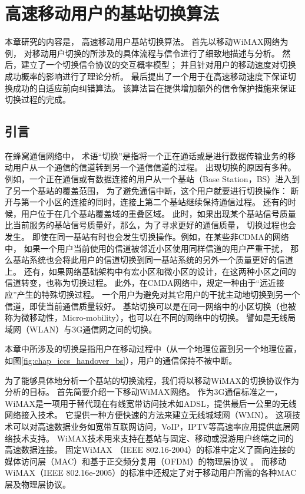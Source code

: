 \graphicspath{ {../body/handover_figures/}}
\chapter{高速移动用户的基站切换算法}
\label{chap_iccs_handover_alogrithm}
本章研究的内容是，
高速移动用户基站切换算法。
首先以移动WiMAX网络为例，
对移动用户切换的所涉及的具体流程与信令进行了细致地描述与分析。
然后，建立了一个切换信令协议的交互概率模型；
并且针对用户的移动速度对切换成功概率的影响进行了理论分析。
最后提出了一个用于在高速移动速度下保证切换成功的自适应前向纠错算法。
该算法旨在提供增加额外的信令保护措施来保证切换过程的完成。


\section{引言}
\label{section_iccs_handover_algorithm_introduction}
在蜂窝通信网络中，
术语“切换”是指将一个正在通话或是进行数据传输业务的移动用户从一个通信的信道转到另一个通信信道的过程。
出现切换的原因有多种。
例如，一个正在通信或有数据连接的用户从一个基站（Base Station，BS）进入到了另一个基站的覆盖范围，
为了避免通信中断，这个用户就要进行切换操作：
断开与第一个小区的连接的同时，连接上第二个基站继续保持通信过程。
还有的时候，用户位于在几个基站覆盖域的重叠区域。
此时，如果出现某个基站信号质量比当前服务的基站信号质量好，那么，为了寻求更好的通信质量，
切换过程也会发生。
即使在同一基站有时也会发生切换操作。例如，在某些非CDMA的网络中，
如果一个用户当前使用的信道被邻近小区使用同样信道的用户严重干扰，
那么基站系统也会将此用户的信道切换到同一基站系统的另外一个质量更好的信道上。
还有，如果网络基础架构中有宏小区和微小区的设计，在这两种小区之间的信道转变，也称为切换过程。
此外，在CMDA网络中，规定一种由于“远近接应”产生的特殊切换过程。
一个用户为避免对其它用户的干扰主动地切换到另一个信道，即使当前通信质量较好。
基站切换可以是在同一网络中的小区切换（也被称为微移动性，Micro-mobility），也可以在不同的网络中的切换。
譬如是无线局域网（WLAN）与3G通信网之间的切换。

本章中所涉及的切换是指用户在移动过程中（从一个地理位置到另一个地理位置，如图\ref{fig:chap_iccs_handover_bs}），用户的通信保持不被中断\cite{Pollini:1996:THD}\cite{Wright:ICMB2007}。

为了能够具体地分析一个基站的切换流程，我们将以移动WiMAX的切换协议作为分析的目标。
首先简要介绍一下移动WiMAX网络。
作为3G通信标准之一，WiMAX是一项用于替代现在有线宽带访问技术如ADSL，提供最后一公里的无线网络接入技术。
它提供一种方便快速的方法来建立无线城域网（WMN）。
这项技术可以对高速数据业务如宽带互联网访问，VoIP，IPTV等高速率应用提供底层网络技术支持。
WiMAX技术用来支持在基站与固定、移动或漫游用户终端之间的高速数据连接。
固定WiMAX （IEEE 802.16-2004）的标准中定义了面向连接的媒体访问层（MAC）和基于正交频分复用（OFDM）的物理层协议 \cite{IEEE:802_16D:2005}。
而移动WiMAX（IEEE 802.16e-2005）的标准中还规定了对于移动用户所需的各种MAC层及物理层协议\cite{IEEE:802_16E:2006}。


